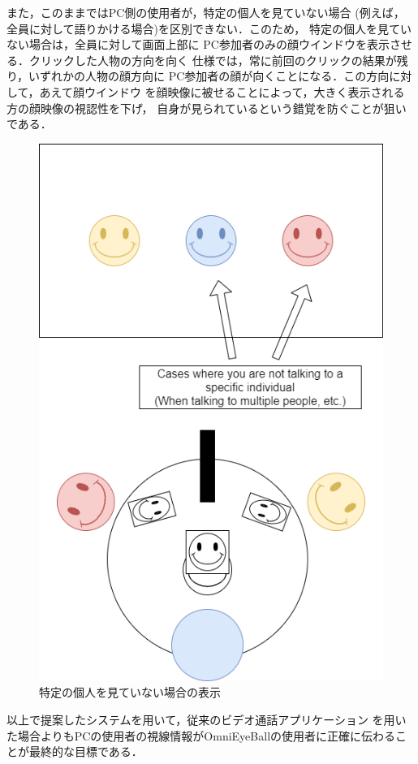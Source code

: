 また，このままではPC側の使用者が，特定の個人を見ていない場合
(例えば，全員に対して語りかける場合)を区別できない．このため，
特定の個人を見ていない場合は，全員に対して画面上部に
PC参加者のみの顔ウインドウを表示させる．クリックした人物の方向を向く
仕様では，常に前回のクリックの結果が残り，いずれかの人物の顔方向に
PC参加者の顔が向くことになる．この方向に対して，あえて顔ウインドウ
を顔映像に被せることによって，大きく表示される方の顔映像の視認性を下げ，
自身が見られているという錯覚を防ぐことが狙いである．

\begin{figure}[tp]
  \centering
  \includegraphics[scale=0.6]{fig/SPcase.png}
  \caption{特定の個人を見ていない場合の表示}
\end{figure}

以上で提案したシステムを用いて，従来のビデオ通話アプリケーション
を用いた場合よりもPCの使用者の視線情報がOmniEyeBallの使用者に正確に伝わることが最終的な目標である．